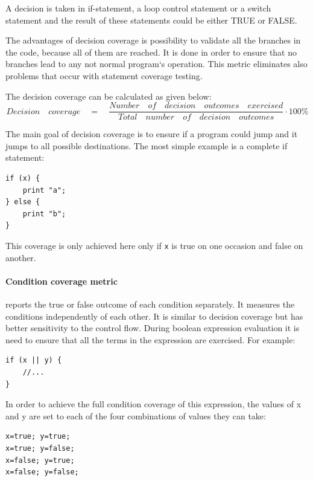 A decision is taken in if-statement, a loop control statement  or a switch statement and the result of these statements could be either TRUE or FALSE.

The advantages of decision coverage is possibility to validate all the branches in the code, because all of them are reached. It is done in order to ensure that no branches lead to any not normal program`s operation. This metric eliminates also problems that occur with statement coverage testing. 

The decision coverage can be calculated as given below:
\begin{equation}
Decision\quad coverage\quad =\quad \frac { Number\quad of\quad decision\quad outcomes\quad exercised }{ Total\quad number\quad of\quad decision\quad outcomes } \cdot 100\%
\end{equation}

The main goal of decision coverage is to ensure if a program could jump and it jumps to all possible destinations. The most simple example is a complete if statement:
\begin{lstlisting}[caption=Decision coverage metric passes,label=lst:decisionpass]
if (x) {
	print "a";
} else {
	print "b";
}
\end{lstlisting}
This coverage is only achieved here only if \texttt{x} is true on one occasion and false on another.

\paragraph{Condition coverage metric} reports the true or false outcome of each condition separately. It measures the conditions independently of each other. It is similar to decision coverage but has better sensitivity to the control flow. During boolean expression evaluation it is need to ensure that all the terms in the expression are exercised. For example:

\begin{lstlisting}[caption=Simple conditional coverage, label=lst:conditional]
if (x || y) {
	//...
} 
\end{lstlisting}

In order to achieve the full condition coverage of this expression, the values of x and y are set to each of the four combinations of values they can take:

\begin{verbatim} 
x=true; y=true;
x=true; y=false;
x=false; y=true;
x=false; y=false;
\end{verbatim} 


